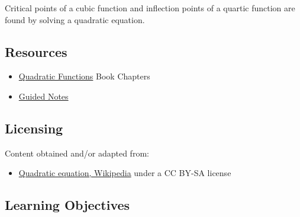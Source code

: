 Critical points of a cubic function and inflection points of a quartic function are found
by solving a quadratic equation.

\subsection{Resources}
\label{sss:reso-55b5}

\begin{itemize}
    \item \href{https://mathresearch.utsa.edu/wikiFiles/MAT1053/Quadratic_Functions/MAT1053_M2.2Quadratic_Functions.pdf}{Quadratic Functions} Book Chapters
\end{itemize}

\begin{itemize}
    \item \href{https://mathresearch.utsa.edu/wikiFiles/MAT1053/Quadratic_Functions/MAT1053_M2.2Quadratic_FunctionsGN.pdf}{Guided Notes}
\end{itemize}

\subsection{Licensing}
\label{sss:lice-7352}

Content obtained and/or adapted from:

\begin{itemize}
    \item \href{https://en.wikipedia.org/wiki/Quadratic_equation}{Quadratic equation, Wikipedia} under a CC BY-SA license
\end{itemize}

\subsection{Learning Objectives}
\label{ssec:lear-46cc}

